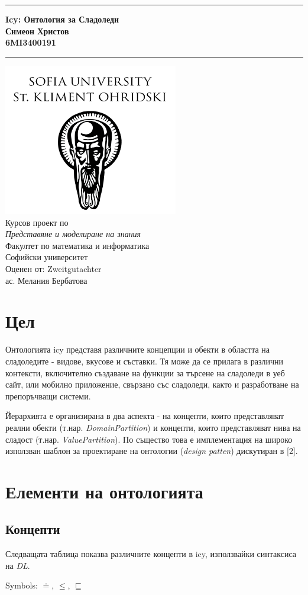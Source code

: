 \documentclass[12pt]{article}
\newcommand{\JMUTitle}[9]{

  \thispagestyle{empty}
  \vspace*{\stretch{1}}
  {\parindent0cm
  \rule{\linewidth}{.7ex}}
  \begin{flushright}
    \vspace*{\stretch{1}}
    \sffamily\bfseries\Huge
    #1\\
    \vspace*{\stretch{1}}
    \sffamily\bfseries\large
    #2\\
    \vspace*{\stretch{1}}
    \sffamily\bfseries\small
    #3
  \end{flushright}
  \rule{\linewidth}{.7ex}

  \vspace*{\stretch{1}}
  \begin{center}
    \includegraphics[width=3in]{./images/logo.png} \\
    \vspace*{\stretch{1}}
    \Large Курсов проект по \\ \textit{Представяне и моделиране на знания} \\

    \vspace*{\stretch{2}}
    \large Факултет по математика и информатика\\
    \large Софийски университет\\
    
    \vspace*{\stretch{1}}
    \large Оценен от:  #8 \\[1mm]
    
    \vspace*{\stretch{1}}
    \large #7 \\

  \end{center}
}
\begin{document}
  

  \JMUTitle
      {Icy: Онтология за Сладоледи}
      {Симеон Христов}
      {6MI3400191}
      
      {Wirtschaftswissenschaftlichen Fakultät}  %
      {W"urzburg 2018}                          %
      {Януари 2023}                              %
      {ас. Мелания Бербатова}               %
      {Zweitgutachter}                          %

  \clearpage

\tableofcontents

\clearpage


\section{Цел} 

    Онтологията icy представя различните концепции и обекти в областта на сладоледите - видове, вкусове и съставки. Тя може да се прилага в различни контексти, включително създаване на
    функции за търсене на сладоледи в уеб сайт, или мобилно приложение, свързано със
    сладоледи, както и разработване на препоръчващи системи.
    
    \vspace{1em}
    
    Йерархията е организирана в два аспекта - на концепти, които представляват реални обекти (т.нар. \textit{DomainPartition}) и концепти, които представляват нива на сладост (т.нар. \textit{ValuePartition}). По същество това е имплементация на широко използван шаблон за проектиране на онтологии (\textit{design patten}) дискутиран в [2].


\section{Елементи на онтологията}

    \subsection{Концепти}
        
        Следващата таблица показва различните концепти в icy, използвайки синтаксиса на \textit{DL}.

        Symbols: $\doteq$, $\leq$, $\sqsubseteq$
\end{document}
